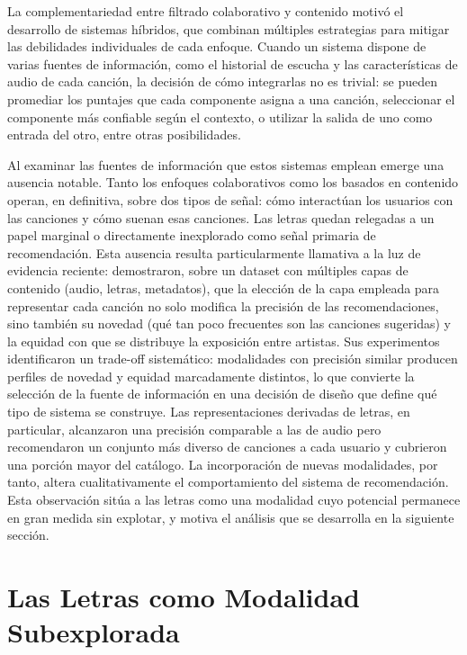 La complementariedad entre filtrado colaborativo y contenido motivó el desarrollo de sistemas híbridos, que combinan múltiples estrategias para mitigar las debilidades individuales de cada enfoque. Cuando un sistema dispone de varias fuentes de información, como el historial de escucha y las características de audio de cada canción, la decisión de cómo integrarlas no es trivial: se pueden promediar los puntajes que cada componente asigna a una canción, seleccionar el componente más confiable según el contexto, o utilizar la salida de uno como entrada del otro, entre otras posibilidades.

Al examinar las fuentes de información que estos sistemas emplean emerge una ausencia notable. Tanto los enfoques colaborativos como los basados en contenido operan, en definitiva, sobre dos tipos de señal: cómo interactúan los usuarios con las canciones y cómo suenan esas canciones. Las letras quedan relegadas a un papel marginal o directamente inexplorado como señal primaria de recomendación. Esta ausencia resulta particularmente llamativa a la luz de evidencia reciente: \textcite{moscati_2022_music4all} demostraron, sobre un dataset con múltiples capas de contenido (audio, letras, metadatos), que la elección de la capa empleada para representar cada canción no solo modifica la precisión de las recomendaciones, sino también su novedad (qué tan poco frecuentes son las canciones sugeridas) y la equidad con que se distribuye la exposición entre artistas. Sus experimentos identificaron un trade-off sistemático: modalidades con precisión similar producen perfiles de novedad y equidad marcadamente distintos, lo que convierte la selección de la fuente de información en una decisión de diseño que define qué tipo de sistema se construye. Las representaciones derivadas de letras, en particular, alcanzaron una precisión comparable a las de audio pero recomendaron un conjunto más diverso de canciones a cada usuario y cubrieron una porción mayor del catálogo. La incorporación de nuevas modalidades, por tanto, altera cualitativamente el comportamiento del sistema de recomendación. Esta observación sitúa a las letras como una modalidad cuyo potencial permanece en gran medida sin explotar, y motiva el análisis que se desarrolla en la siguiente sección.

\section{Las Letras como Modalidad Subexplorada}
\label{sec:letras-modalidad}

